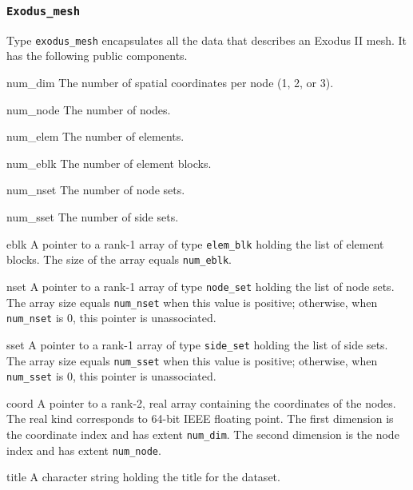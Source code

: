 \documentclass[oneside,12pt]{amsart}
\newenvironment{ttlist}[1]%
  {\begin{list}{}{\renewcommand{\makelabel}[1]{\hfil\ttfamily ##1}%
    \settowidth{\labelsep}{\quad} \setlength{\itemsep}{\parskip}%
    \settowidth{\labelwidth}{\ttfamily #1}%
    \setlength{\leftmargin}{\labelwidth+2\labelsep}%
    \setlength{\listparindent}{0pt}}}%
  {\end{list}}
\begin{document}
\subsubsection{\texttt{Exodus_mesh}}
Type \texttt{exodus_mesh} encapsulates all the data that describes an
Exodus II mesh.  It has the following public components.
\begin{ttlist}{elem_type}
\item[num_dim] The number of spatial coordinates per node (1, 2, or 3).
\item[num_node] The number of nodes.
\item[num_elem] The number of elements.
\item[num_eblk] The number of element blocks.
\item[num_nset] The number of node sets.
\item[num_sset] The number of side sets.
\item[eblk] A pointer to a rank-1 array of type \texttt{elem_blk} holding the
  list of element blocks.  The size of the array equals \texttt{num_eblk}.
\item[nset] A pointer to a rank-1 array of type \texttt{node_set} holding the
  list of node sets.  The array size equals \texttt{num_nset} when this value
  is positive; otherwise, when \texttt{num_nset} is 0, this pointer is
  unassociated.
\item[sset] A pointer to a rank-1 array of type \texttt{side_set} holding the
  list of side sets.  The array size equals \texttt{num_sset} when this value
  is positive; otherwise, when \texttt{num_sset} is 0, this pointer is
  unassociated.
\item[coord] A pointer to a rank-2, real array containing the coordinates
  of the nodes.  The real kind corresponds to 64-bit IEEE floating point.
  The first dimension is the coordinate index and has extent \texttt{num_dim}.
  The second dimension is the node index and has extent \texttt{num_node}.
\item[title] A character string holding the title for the dataset.
\end{ttlist}
\end{document}
